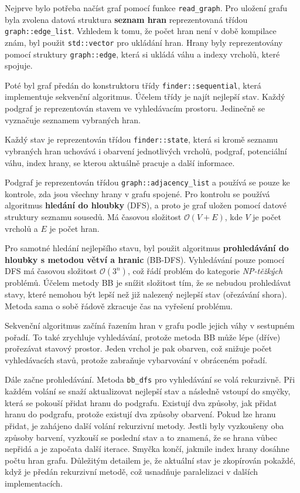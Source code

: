 Nejprve bylo potřeba načíst graf pomocí funkce \texttt{read\_graph}.
Pro uložení grafu byla zvolena datová struktura \textbf{seznam hran} reprezentovaná třídou \texttt{graph::edge\_list}.
Vzhledem k tomu, že počet hran není v době kompilace znám, byl použit \texttt{std::vector} pro ukládání hran.
Hrany byly reprezentovány pomocí struktury \texttt{graph::edge}, která si ukládá váhu a indexy vrcholů, které spojuje.

Poté byl graf předán do konstruktoru třídy \texttt{finder::sequential}, která implementuje sekvenční algoritmus.
Účelem třídy je najít nejlepší stav.
Každý podgraf je reprezentován stavem ve vyhledávacím prostoru.
Jedinečně se vyznačuje seznamem vybraných hran.

Každý stav je reprezentován třídou \texttt{finder::state}, která si kromě seznamu vybraných hran uchovává i obarvení jednotlivých vrcholů, podgraf, potenciální váhu, index hrany, se kterou aktuálně pracuje a další informace.

Podgraf je reprezentován třídou \texttt{graph::adjacency\_list} a používá se pouze ke kontrole, zda jsou všechny hrany v grafu spojené.
Pro kontrolu se používá algoritmus \textbf{hledání do hloubky} (DFS), a proto je graf uložen pomocí datové struktury seznamu sousedů.
Má časovou složitost \(\mathcal{O}(V+E)\), kde \(V\) je počet vrcholů a \(E\) je počet hran.

Pro samotné hledání nejlepšího stavu, byl použit algoritmus \textbf{prohledávání do hloubky s metodou větví a hranic} (BB-DFS).
Vyhledávání pouze pomocí DFS má časovou složitost \(\mathcal{O}(3^n)\), což řádí problém do kategorie \textit{NP-těžkých} problémů.
Účelem metody BB je snížit složitost tím, že se nebudou prohledávat stavy, které nemohou být lepší než již nalezený nejlepší stav (ořezávání shora).
Metoda sama o sobě řádově zkracuje čas na vyřešení problému.

Sekvenční algoritmus začíná řazením hran v grafu podle jejich váhy v sestupném pořadí.
To také zrychluje vyhledávání, protože metoda BB může lépe (dříve) prořezávat stavový prostor.
Jeden vrchol je pak obarven, což snižuje počet vyhledávacích stavů, protože zabraňuje vybarvování v obráceném pořadí.

Dále začne prohledávání.
Metoda \texttt{bb\_dfs} pro vyhledávání se volá rekurzivně.
Při každém volání se snaží aktualizovat nejlepší stav a následně vstoupí do smyčky, která se pokouší přidat hranu do podgrafu.
Existují dva způsoby, jak přidat hranu do podgrafu, protože existují dva způsoby obarvení.
Pokud lze hranu přidat, je zahájeno další volání rekurzivní metody.
Jestli byly vyzkoušeny oba způsoby barvení, vyzkouší se poslední stav a to znamená, že se hrana vůbec nepřidá a je započata další iterace.
Smyčka končí, jakmile index hrany dosáhne počtu hran grafu.
Důležitým detailem je, že aktuální stav je zkopírován pokaždé, když je předán rekurzivní metodě, což usnadňuje paralelizaci v dalších implementacích.

